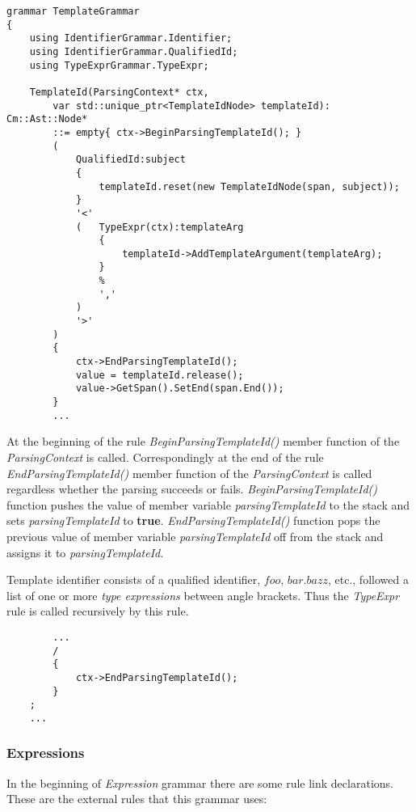 \documentclass[a4paper,oneside,11pt]{book}
\theoremstyle{definition}
\begin{document}
\lstset{language=cmpg}
\begin{lstlisting}
grammar TemplateGrammar
{
    using IdentifierGrammar.Identifier;
    using IdentifierGrammar.QualifiedId;
    using TypeExprGrammar.TypeExpr;

    TemplateId(ParsingContext* ctx,
        var std::unique_ptr<TemplateIdNode> templateId): Cm::Ast::Node*
        ::= empty{ ctx->BeginParsingTemplateId(); }
        (
            QualifiedId:subject
            {
                templateId.reset(new TemplateIdNode(span, subject));
            }
            '<'
            (   TypeExpr(ctx):templateArg
                {
                    templateId->AddTemplateArgument(templateArg);
                }
                %
                ','
            )
            '>'
        )
        {
            ctx->EndParsingTemplateId();
            value = templateId.release();
            value->GetSpan().SetEnd(span.End());
        }
        ...
\end{lstlisting}

At the beginning of the rule \emph{BeginParsingTemplateId()}
member function of the \emph{ParsingContext} is called.
Correspondingly at the end of the rule
\emph{EndParsingTemplateId()} member function of the \emph{ParsingContext}
is called regardless whether the parsing succeeds or fails.
\emph{BeginParsingTemplateId()} function pushes the value of member variable
\emph{parsingTemplateId} to the stack and sets \emph{parsingTemplateId} to \textbf{true}.
\emph{EndParsingTemplateId()} function pops the previous value of member variable
\emph{parsingTemplateId} off from the stack and assigns it to
\emph{parsingTemplateId}.

Template identifier consists of a qualified identifier, $foo$, $bar.bazz$, etc.,
followed a list of one or more \emph{type expressions} between
angle brackets. Thus the \emph{TypeExpr} rule
is called recursively by this rule.

\lstset{language=cmpg}
\begin{lstlisting}
        ...
        /
        {
            ctx->EndParsingTemplateId();
        }
    ;
    ...
\end{lstlisting}

\subsubsection{Expressions}

In the beginning of \emph{Expression} grammar there are some rule link declarations.
These are the external rules that this grammar uses:
\end{document}

